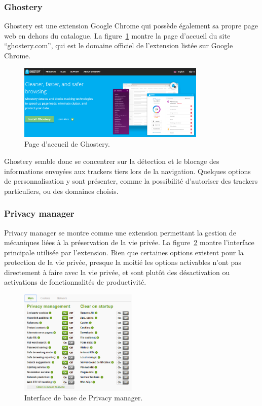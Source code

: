 		\subsubsection{Ghostery}

			Ghostery est une extension Google Chrome qui possède également sa propre page web en dehors du catalogue. La figure~\ref{a-ghostery} montre la page d'accueil du site ``ghostery.com'', qui est le domaine officiel de l'extension listée sur Google Chrome.

			\begin{figure}[h]
				\centering
				\includegraphics[width=0.8\textwidth]{images/analysis/ghostery}
				\caption{Page d'accueil de Ghostery\cite{ghostery}.}
				\label{a-ghostery}
			\end{figure}

			Ghostery semble donc se concentrer sur la détection et le blocage des informations envoyées aux trackers tiers lors de la navigation. Quelques options de personnalisation y sont présenter, comme la possibilité d'autoriser des trackers particuliers, ou des domaines choisis.

		\subsubsection{Privacy manager}

			Privacy manager se montre comme une extension permettant la gestion de mécaniques liées à la préservation de la vie privée. La figure~\ref{a-privacymanager} montre l'interface principale utilisée par l'extension.
			Bien que certaines options existent pour la protection de la vie privée, presque la moitié les options activables n'ont pas directement à faire avec la vie privée, et sont plutôt des désactivation ou activations de fonctionnalités de productivité.

			\begin{figure}[h]
				\centering
				\includegraphics[width=0.5\textwidth]{images/analysis/privacy-manager}
				\caption{Interface de base de Privacy manager\cite{privacymanager}.}
				\label{a-privacymanager}
			\end{figure}

